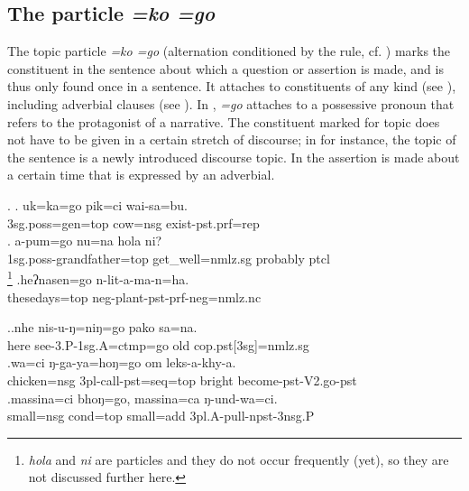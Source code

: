 \subsection{The particle \emph{=ko \ti =go}}

The topic particle \emph{=ko \ti =go} (alternation conditioned by the  rule, cf. ) marks the constituent in the sentence about which a question or  assertion is made, and is thus only found once in a sentence. It  attaches to constituents of any kind (see \Next), including adverbial clauses (see \NNext). In \Next[a], \emph{=go} attaches to a possessive pronoun that refers to the protagonist of a narrative. The constituent marked for topic does not have to be given in a certain stretch of discourse; in \Next[b] for instance, the topic of the sentence is a newly introduced discourse topic. In \Next[c] the assertion is made about a certain time that is expressed by an adverbial. 

\ex. \ag. uk=ka=go  pik=ci wai-sa=bu.\\
{\sc 3sg.poss=gen=top} cow{\sc =nsg} exist{\sc -pst.prf=rep}\\
 
\bg. a-pum=go  nu=na hola ni?\\
		{\sc 1sg.poss-}grandfather{\sc =top} get\_well{\sc [3sg]=nmlz.sg} probably {\sc ptcl}\\
		\footnote{\emph{hola} and \emph{ni} are  particles and they do not occur frequently (yet), so they are not discussed further here.} 
		\bg.heʔnasen=go    n-lit-a-ma-n=ha.\\
		thesedays{\sc =top} {\sc neg-}plant{\sc [3sg]-pst-prf-neg=nmlz.nc}\\
		 
		
		\ex.\ag.nhe  nis-u-ŋ=niŋ=go                     pako         sa=na.\\
		here see{\sc [pst]-3.P-1sg.A=ctmp=go} old  {\sc cop.pst[3sg]=nmlz.sg}\\
		 
		\bg.wa=ci         ŋ-ga-ya=hoŋ=go                  om     leks-a-khy-a.\\
		chicken{\sc =nsg} {\sc 3pl-}call{\sc -pst=seq=top} bright become{\sc [3]-pst-V2.go-pst}\\
		 
		\bg.massina=ci    bhoŋ=go,    massina=ca        ŋ-und-wa=ci.\\
		small{\sc =nsg} {\sc cond=top} small{\sc =add} {\sc 3pl.A-}pull{\sc -npst-3nsg.P}\\
		 
				

